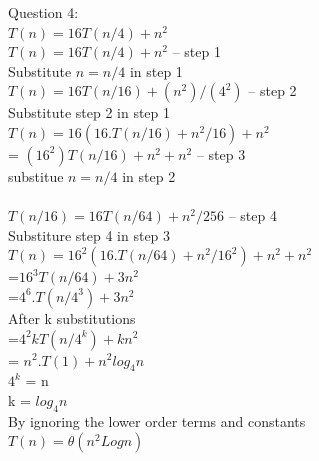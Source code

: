 \documentclass[11pt]{article}
\begin{document}
\begin{enumerate}
Question 4:\\
$T(n) = 16T(n/4)+n^2 $  \\
$T(n) = 16T(n/4)+n^2 $ -- step 1 \\
Substitute $n=n/4$ in step 1 \\
$T(n) = 16T(n/16)+(n^2)/(4^2) $ -- step 2 \\
Substitute step 2 in step 1 \\
$T(n) = 16(16.T(n/16)+n^2/16)+n^2$ \\
     = $(16^2)T(n/16)+n^2+n^2$ -- step 3 \\
substitue $n=n/4$ in step 2 \\\\
$T(n/16) = 16T(n/64)+n^2/256$ -- step 4 \\
Substiture step 4 in step 3 \\
$T(n) = 16^2 (16.T(n/64)+n^2/16^2)+n^2+n^2$ \\
      =$16^3T(n/64) + 3n^2$ \\
      =$4^6.T(n/4^3)+3n^2$ \\
After k substitutions \\
    =$4^2k T(n/4^k)+kn^2$\\
    = $n^2.T(1)+n^2 log_4n$\\
$4^k$ = n \\
k = $log_4n$\\ 
By ignoring the lower order terms and constants \\
$T(n) = \theta (n^2 Log n)$

\end{enumerate}
\end{document}
